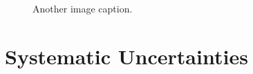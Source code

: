 \begin{figure}[h]
\begin{minipage}{0.48\textwidth}
{    }
    \caption{Another image caption.}
    \label{AnotherImage}
  \end{minipage}
\end{figure}


\section{Systematic Uncertainties}



